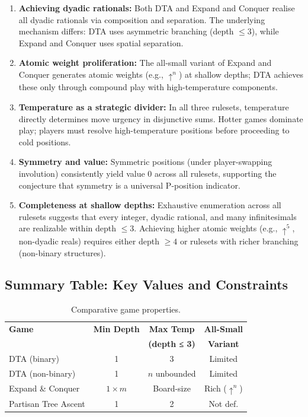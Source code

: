 \documentclass[10pt,a4paper,twocolumn]{article}
\theoremstyle{plain}
\theoremstyle{definition}
\theoremstyle{remark}
\begin{document}
\begin{enumerate}
\item \textbf{Achieving dyadic rationals:} Both DTA and Expand and Conquer realise all dyadic rationals via composition and separation. The underlying mechanism differs: DTA uses asymmetric branching (depth $\le 3$), while Expand and Conquer uses spatial separation.

\item \textbf{Atomic weight proliferation:} The all-small variant of Expand and Conquer generates atomic weights (e.g., $\uparrow^n$) at shallow depths; DTA achieves these only through compound play with high-temperature components.

\item \textbf{Temperature as a strategic divider:} In all three rulesets, temperature directly determines move urgency in disjunctive sums. Hotter games dominate play; players must resolve high-temperature positions before proceeding to cold positions.

\item \textbf{Symmetry and value:} Symmetric positions (under player-swapping involution) consistently yield value $0$ across all rulesets, supporting the conjecture that symmetry is a universal P-position indicator.

\item \textbf{Completeness at shallow depths:} Exhaustive enumeration across all rulesets suggests that every integer, dyadic rational, and many infinitesimals are realizable within depth $\le 3$. Achieving higher atomic weights (e.g., $\uparrow^5$, non-dyadic reals) requires either depth $\ge 4$ or rulesets with richer branching (non-binary structures).
\end{enumerate}

\vspace{12pt}

\subsection{Summary Table: Key Values and Constraints}

\begin{table}[h]
\centering
\small
\renewcommand{\arraystretch}{1.3}
\begin{tabular}{@{}l|c|c|c@{}}
\hline
\textbf{Game} & \textbf{Min Depth} & \textbf{Max Temp} & \textbf{All-Small} \\
& & \textbf{(depth ≤ 3)} & \textbf{Variant} \\
\hline
DTA (binary) & 1 & 3 & Limited \\
DTA (non-binary) & 1 & $n$ unbounded & Limited \\
Expand \& Conquer & $1 \times m$ & Board-size & Rich ($\uparrow^n$) \\
Partisan Tree Ascent & 1 & 2 & Not def. \\
\hline
\end{tabular}
\caption{Comparative game properties.}
\end{table}
\end{document}
